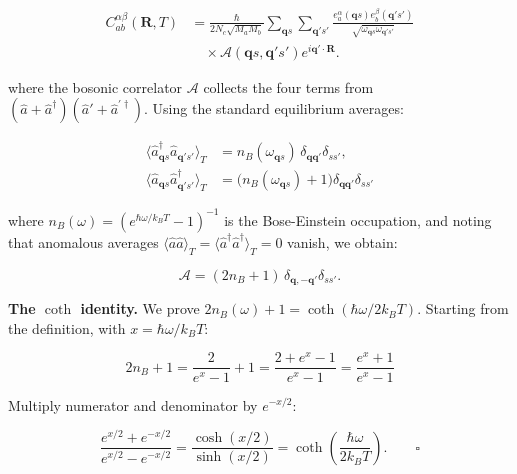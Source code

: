 \documentclass[aps,prb,reprint,amsmath,amssymb,floatfix]{revtex4-2}
\begin{document}
\color{revisionblue}
{\footnotesize
\begin{equation*}
\begin{aligned}
C_{ab}^{\alpha\beta}(\mathbf R,T)
 &=\frac{\hbar}{2N_c\sqrt{M_aM_b}}
   \sum_{\mathbf q s}\sum_{\mathbf q's'}
   \frac{e_a^\alpha(\mathbf q s)e_b^\beta(\mathbf q's')}
   {\sqrt{\omega_{\mathbf q s}\omega_{\mathbf q's'}}}\\
 &\quad\times\mathcal A(\mathbf q s,\mathbf q's')
 e^{i\mathbf q'\cdot\mathbf R}.
\end{aligned}
\end{equation*}
}
\color{black}

where the bosonic correlator \(\mathcal{A}\) collects the four terms
from \((\hat{a}+\hat{a}^\dagger)(\hat{a}'+\hat{a}^{\prime\dagger})\).
Using the standard equilibrium averages:

\begin{align*}
\langle\hat{a}_{\mathbf{q}s}^\dagger\hat{a}_{\mathbf{q}'s'}\rangle_T
  &= n_B(\omega_{\mathbf{q}s})\,\delta_{\mathbf{q}\mathbf{q}'}\delta_{ss'}, \\
\langle\hat{a}_{\mathbf{q}s}\hat{a}_{\mathbf{q}'s'}^\dagger\rangle_T
  &= \bigl(n_B(\omega_{\mathbf{q}s})+1\bigr)\delta_{\mathbf{q}\mathbf{q}'}\delta_{ss'}
\end{align*}

where \(n_B(\omega) = (e^{\hbar\omega/k_BT}-1)^{-1}\) is the
Bose-Einstein occupation, and noting that anomalous averages
\(\langle\hat{a}\hat{a}\rangle_T = \langle\hat{a}^\dagger\hat{a}^\dagger\rangle_T = 0\)
vanish, we obtain:

\color{revisionblue}
\begin{equation*}
\mathcal A=(2n_B+1)\,
\delta_{\mathbf q,-\mathbf q'}\delta_{ss'} .
\end{equation*}
\color{black}

\textbf{The \(\coth\) identity.} We prove
\(2n_B(\omega)+1 = \coth(\hbar\omega/2k_BT)\). Starting from the
definition, with \(x = \hbar\omega/k_BT\):

\begin{equation*}
2n_B+1 = \frac{2}{e^x-1}+1 = \frac{2+e^x-1}{e^x-1} = \frac{e^x+1}{e^x-1}
\end{equation*}

Multiply numerator and denominator by \(e^{-x/2}\):

\color{revisionblue}
\begin{equation*}
\frac{e^{x/2}+e^{-x/2}}{e^{x/2}-e^{-x/2}}
=\frac{\cosh(x/2)}{\sinh(x/2)}
=\coth\!\left(\frac{\hbar\omega}{2k_BT}\right). \qquad \square
\end{equation*}
\color{black}
\end{document}
